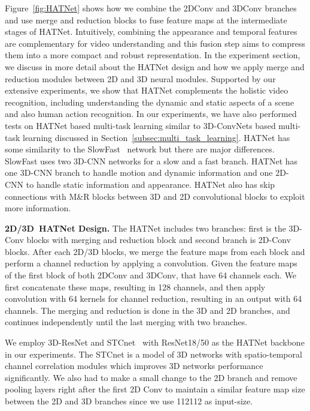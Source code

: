 \documentclass[runningheads]{llncs}
\begin{document}
Figure~\ref{fig:HATNet} shows how we combine the 2DConv and 3DConv branches and  use merge and reduction blocks to fuse feature maps at the intermediate stages of HATNet.  Intuitively, combining the appearance and temporal features are complementary for video understanding and this fusion step aims to compress them into a more compact and robust representation.
In the experiment section, we discuss in more detail about the HATNet design and how we apply merge and reduction modules between 2D and 3D neural modules.
Supported by our extensive experiments,
we show that HATNet complements the holistic video recognition, including understanding the dynamic and static aspects of a scene and also human action recognition. In our experiments, we have also performed tests on HATNet based multi-task learning similar to 3D-ConvNets based multi-task learning discussed in Section~\ref{subsec:multi_task_learning}. HATNet has some similarity to the SlowFast~\cite{slowfast} network but there are major differences. SlowFast uses two 3D-CNN networks for a slow and a fast branch. HATNet has one 3D-CNN branch to handle motion and dynamic information and one 2D-CNN to handle static information and appearance. HATNet also has skip connections with M\&R blocks between 3D and 2D convolutional blocks to exploit more information.



\textbf{2D/3D~HATNet Design.}
 The HATNet includes two branches: first is the 3D-Conv blocks with merging and reduction block and second branch is 2D-Conv blocks. 
After each 2D/3D blocks, we merge the feature maps from each block and perform a channel reduction by applying a  convolution. Given the feature maps of the first block of both 2DConv and 3DConv, that have 64 channels each. We first concatenate these maps, resulting in 128 channels, and then apply  convolution with 64 kernels for channel reduction, resulting in an output with 64 channels.
The merging and reduction is done in the 3D and 2D branches, and continues independently until the last merging with two branches. 

We employ 3D-ResNet and STCnet~\cite{stcnn} with ResNet18/50 as the HATNet backbone in our experiments. The STCnet is a model of 3D networks with spatio-temporal channel correlation modules which improves 3D networks performance significantly. We also had to make a small change to the 2D branch and remove pooling layers right after the first 2D Conv to maintain a similar feature map size between the 2D and 3D branches since we use 112112 as input-size.
\end{document}
